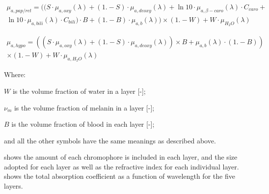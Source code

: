 \begin{equation}
\begin{split}
\mu_{a,pap/ret}=((S \cdot \mu_{a,oxy}(\lambda) + (1. - S) \cdot \mu_{a,deoxy}(\lambda) + \ln10 \cdot \mu_{a,\beta-caro}(\lambda) \cdot C_{caro} + \\ \ln10 \cdot \mu_{a,bili}(\lambda)\cdot C_{bili})\cdot B +  (1. - B)\cdot \mu_{a,b}(\lambda)) \times (1. - W) + W \cdot \mu_{H_2O}(\lambda)
\end{split}
\label{eqn:dermisabs}
\end{equation}

\begin{equation}
\begin{split}
\mu_{a,hypo}=((S\cdot \mu_{a,oxy}(\lambda) + (1. - S) \cdot \mu_{a,deoxy}(\lambda)) \times B + \mu_{a,b}(\lambda) \cdot (1. - B))\\ \times (1. - W) + W \cdot \mu_{a,H_2O}(\lambda)
\end{split}
\label{eqn:hypoabs}
\end{equation}

\noindent Where:

\indent $W$ is the volume fraction of water in a layer [-];

\indent $\nu_m$ is the volume fraction of melanin in a layer [-];

\indent $B$ is the volume fraction of blood in each layer [-];

\indent and all the other symbols have the same meanings as described above.

\medskip

 shows the amount of each chromophore is included in each layer, and the size adopted for each layer as well as the refractive index for each individual layer.
 shows the total absorption coefficient as a function of wavelength for the five layers.


